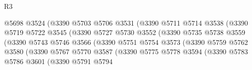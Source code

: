\begin{lexlean}{R3}
\begin{coremodule}
                                    @5698
                                    @3524
                                    (@3390
                                      @5703
                                      @5706
                                      @3531
                                      (@3390
                                        @5711
                                        @5714
                                        @3538
                                        (@3390
                                          @5719
                                          @5722
                                          @3545
                                          (@3390
                                            @5727
                                            @5730
                                            @3552
                                            (@3390
                                              @5735
                                              @5738
                                              @3559
                                              (@3390
                                                @5743
                                                @5746
                                                @3566
                                                (@3390
                                                  @5751
                                                  @5754
                                                  @3573
                                                  (@3390
                                                    @5759
                                                    @5762
                                                    @3580
                                                    (@3390
                                                      @5767
                                                      @5770
                                                      @3587
                                                      (@3390
                                                        @5775
                                                        @5778
                                                        @3594
                                                        (@3390
                                                          @5783
                                                          @5786
                                                          @3601
                                                          (@3390
                                                            @5791
                                                            @5794

\end{coremodule}
\end{lexlean}
